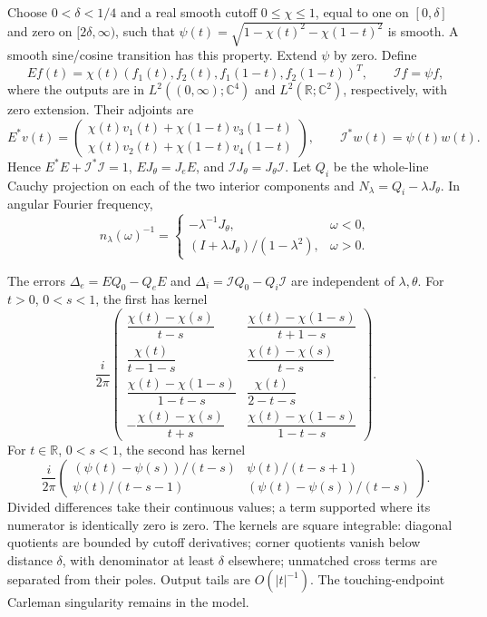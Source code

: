 Choose $0<\delta<1/4$ and a real smooth cutoff $0\le\chi\le1$, equal to one on
$[0,\delta]$ and zero on $[2\delta,\infty)$, such that
$\psi(t)=\sqrt{1-\chi(t)^2-\chi(1-t)^2}$ is smooth.  A smooth
sine/cosine transition has this property.  Extend $\psi$ by zero.
Define
\[
 Ef(t)=\chi(t)(f_1(t),f_2(t),f_1(1-t),f_2(1-t))^T,
 \qquad \mathcal If=\psi f,
\]
where the outputs are in $L^2((0,\infty);\mathbb C^4)$ and
$L^2(\mathbb R;\mathbb C^2)$, respectively, with zero extension.
Their adjoints are
\[
 E^*v(t)=\begin{pmatrix}
 \chi(t)v_1(t)+\chi(1-t)v_3(1-t)\\
 \chi(t)v_2(t)+\chi(1-t)v_4(1-t)
 \end{pmatrix},\qquad \mathcal I^*w(t)=\psi(t)w(t).
\]
Hence $E^*E+\mathcal I^*\mathcal I=1$, $EJ_\theta=J_eE$, and $\mathcal IJ_\theta=J_\theta\mathcal I$.
Let $Q_i$ be the whole-line Cauchy projection on each of the two interior
components and $N_\lambda=Q_i-\lambda J_\theta$.  In angular Fourier
frequency,
\begin{equation}\label{v12:eq:interior-inverse}
 n_\lambda(\omega)^{-1}=
 \begin{cases}-\lambda^{-1}J_\theta,&\omega<0,\\
 (I+\lambda J_\theta)/(1-\lambda^2),&\omega>0.
 \end{cases}
\end{equation}

The errors $\Delta_e=EQ_0-Q_eE$ and $\Delta_i=\mathcal IQ_0-Q_i\mathcal I$ are
independent of $\lambda,\theta$.  For $t>0$, $0<s<1$, the first has
kernel
\begin{equation}\label{v12:eq:endpoint-defect-kernel}
 \frac{i}{2\pi}\begin{pmatrix}
 \dfrac{\chi(t)-\chi(s)}{t-s}&
 \dfrac{\chi(t)-\chi(1-s)}{t+1-s}\\[5pt]
 \dfrac{\chi(t)}{t-1-s}&
 \dfrac{\chi(t)-\chi(s)}{t-s}\\[5pt]
 \dfrac{\chi(t)-\chi(1-s)}{1-t-s}&
 \dfrac{\chi(t)}{2-t-s}\\[5pt]
 -\dfrac{\chi(t)-\chi(s)}{t+s}&
 \dfrac{\chi(t)-\chi(1-s)}{1-t-s}
 \end{pmatrix}.
\end{equation}
For $t\in\mathbb R$, $0<s<1$, the second has kernel
\begin{equation}\label{v12:eq:interior-defect-kernel}
 \frac{i}{2\pi}\begin{pmatrix}
 (\psi(t)-\psi(s))/(t-s)&\psi(t)/(t-s+1)\\
 \psi(t)/(t-s-1)&(\psi(t)-\psi(s))/(t-s)
 \end{pmatrix}.
\end{equation}
Divided differences take their continuous values; a term supported where
its numerator is identically zero is zero.  The kernels are square integrable: diagonal quotients are bounded by
cutoff derivatives; corner quotients vanish below distance $\delta$,
with denominator at least $\delta$ elsewhere; unmatched cross terms
are separated from their poles. Output tails are $O(|t|^{-1})$.
The touching-endpoint Carleman singularity remains in the model.

